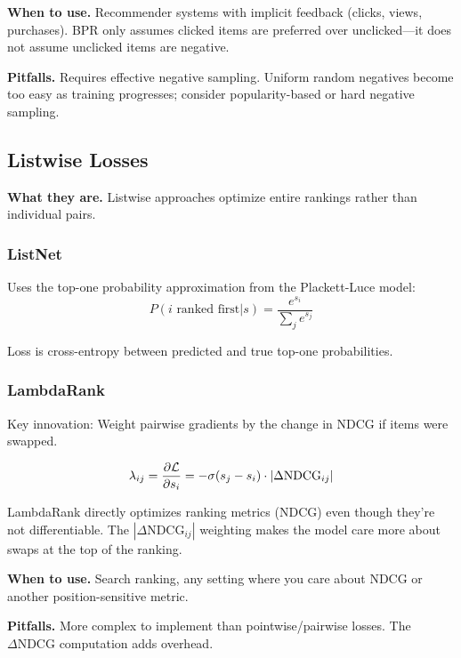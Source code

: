 \textbf{When to use.} Recommender systems with implicit feedback (clicks, views, purchases). BPR only assumes clicked items are preferred over unclicked---it does not assume unclicked items are negative.

\textbf{Pitfalls.} Requires effective negative sampling. Uniform random negatives become too easy as training progresses; consider popularity-based or hard negative sampling.

\subsection{Listwise Losses}

\textbf{What they are.} Listwise approaches optimize entire rankings rather than individual pairs.

\subsubsection{ListNet}

Uses the top-one probability approximation from the Plackett-Luce model:
\begin{equation}
P(i \text{ ranked first} | s) = \frac{e^{s_i}}{\sum_j e^{s_j}}
\end{equation}

Loss is cross-entropy between predicted and true top-one probabilities.

\subsubsection{LambdaRank}

Key innovation: Weight pairwise gradients by the change in NDCG if items were swapped.

\begin{equation}
\lambda_{ij} = \frac{\partial \mathcal{L}}{\partial s_i} = -\sigma(s_j - s_i) \cdot |\Delta\text{NDCG}_{ij}|
\end{equation}

\begin{keyinsight}
LambdaRank directly optimizes ranking metrics (NDCG) even though they're not differentiable. The $|\Delta\text{NDCG}_{ij}|$ weighting makes the model care more about swaps at the top of the ranking.
\end{keyinsight}

\textbf{When to use.} Search ranking, any setting where you care about NDCG or another position-sensitive metric.

\textbf{Pitfalls.} More complex to implement than pointwise/pairwise losses. The $\Delta\text{NDCG}$ computation adds overhead.

